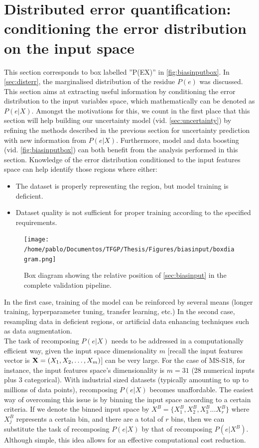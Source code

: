\section{Distributed error quantification: conditioning the error distribution on the input space}\label{sec:biasinput}
This section corresponds to box labelled ''P(E\textbar{}X)'' in \autoref{fig:biasinputbox}. In \autoref{sec:disterr}, the marginalised distribution of the residue $P(e)$ was discussed. This section aims at extracting useful information by conditioning the error distribution to the input variables space, which mathematically can be denoted as $P(e|X)$. Amongst the motivations for this, we count in the first place that this section will help building our uncertainty model (vid. \autoref{sec:uncertainty}) by refining the methods described in the previous section for uncertainty prediction with new information from $P(e|X)$. Furthermore, model and data boosting (vid. \autoref{fig:biasinputbox}) can both benefit from the analysis performed in this section. Knowledge of the error distribution conditioned to the input features space can help identify those regions where either:
\begin{itemize}
	\item The dataset is properly representing the region, but model training is deficient.
	\item Dataset quality is not sufficient for proper training according to the specified requirements.
\end{itemize}
\begin{figure}[!htb]
	\centering
	\texttt{[image: /home/pablo/Documentos/TFGP/Thesis/Figures/biasinput/boxdiagram.png]}
	\caption{Box diagram showing the relative position of \autoref{sec:biasinput} in the complete validation pipeline.}
	\label{fig:biasinputbox} 
\end{figure}
\indent In the first case, training of the model can be reinforced by several means (longer training, hyperparameter tuning, transfer learning, etc.) In the second case, resampling data in deficient regions, or artificial data enhancing techniques such as data augmentation\cite{taylor2018improving}.\\
%
\indent The task of recomposing $P(e|X)$ needs to be addressed in a computationally efficient way, given the input space dimensionality $m$ [recall the input features vector is ${\bf X}=(X_1,X_2,\dots,X_m)$] can be very large. For the case of MS-S18, for instance, the input features space's dimensionality is $m=31$ (28 numerical inputs plus 3 categorical). With industrial sized datasets (typically amounting to up to millions of data points), recomposing $P(e|X)$ becomes unaffordable. The easiest way of overcoming this issue is by binning the input space according to a certain criteria. If we denote the binned input space by $X^B=\{X^B_1,X^B_2,X^B_3\ldots X^B_r\}$ where $X^B_j$ represents a certain bin, and there are a total of $r$ bins, then we can substitute the task of recomposing $P(e|X)$ by that of recomposing $P(e|X^B)$. Although simple, this idea allows for an effective computational cost reduction.\\
%
